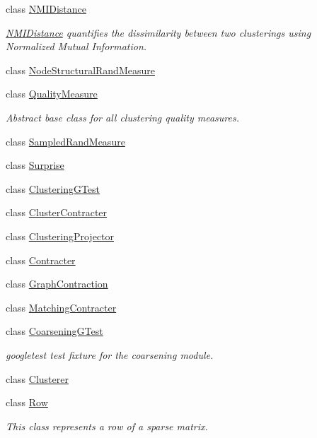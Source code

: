 \begin{DoxyCompactItemize}
\item 
class \hyperlink{class_networ_kit_1_1_n_m_i_distance}{N\-M\-I\-Distance}
\begin{DoxyCompactList}\small\item\em \hyperlink{class_networ_kit_1_1_n_m_i_distance}{N\-M\-I\-Distance} quantifies the dissimilarity between two clusterings using Normalized Mutual Information. \end{DoxyCompactList}\item 
class \hyperlink{class_networ_kit_1_1_node_structural_rand_measure}{Node\-Structural\-Rand\-Measure}
\item 
class \hyperlink{class_networ_kit_1_1_quality_measure}{Quality\-Measure}
\begin{DoxyCompactList}\small\item\em Abstract base class for all clustering quality measures. \end{DoxyCompactList}\item 
class \hyperlink{class_networ_kit_1_1_sampled_rand_measure}{Sampled\-Rand\-Measure}
\item 
class \hyperlink{class_networ_kit_1_1_surprise}{Surprise}
\item 
class \hyperlink{class_networ_kit_1_1_clustering_g_test}{Clustering\-G\-Test}
\item 
class \hyperlink{class_networ_kit_1_1_cluster_contracter}{Cluster\-Contracter}
\item 
class \hyperlink{class_networ_kit_1_1_clustering_projector}{Clustering\-Projector}
\item 
class \hyperlink{class_networ_kit_1_1_contracter}{Contracter}
\item 
class \hyperlink{class_networ_kit_1_1_graph_contraction}{Graph\-Contraction}
\item 
class \hyperlink{class_networ_kit_1_1_matching_contracter}{Matching\-Contracter}
\item 
class \hyperlink{class_networ_kit_1_1_coarsening_g_test}{Coarsening\-G\-Test}
\begin{DoxyCompactList}\small\item\em googletest test fixture for the coarsening module. \end{DoxyCompactList}\item 
class \hyperlink{class_networ_kit_1_1_clusterer}{Clusterer}
\item 
class \hyperlink{class_networ_kit_1_1_row}{Row}
\begin{DoxyCompactList}\small\item\em This class represents a row of a sparse matrix. \end{DoxyCompactList}\item 

\end{DoxyCompactItemize}
